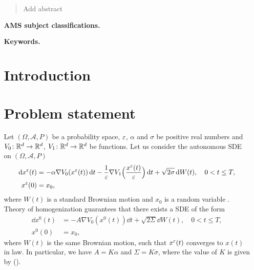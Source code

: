 \documentclass[10pt]{article}
\begin{document}
\maketitle	

\begin{abstract} Add abstract
\end{abstract}

\textbf{AMS subject classifications.} 

\textbf{Keywords.} 

\normalsize
\section{Introduction}

\section{Problem statement}

Let $(\Omega, \mathcal A, P)$ be a probability space, $\varepsilon$, $\alpha$ and $\sigma$ be positive real numbers and $V_0 \colon \mathbb{R}^d \to \mathbb{R}^d$, $V_1 \colon \mathbb{R}^d \to \mathbb{R}^d$ be  functions. Let us consider the autonomous SDE on $(\Omega, \mathcal A, P)$
\begin{equation}\label{eq:SDE_MS}
\begin{aligned}
	\mathrm{d} x^\varepsilon(t) &= -\alpha \nabla V_0(x^\varepsilon(t)) \,\mathrm{d} t - \frac{1}{\varepsilon}\nabla V_1\Big(\frac{x^\varepsilon(t)}{\varepsilon}\Big) \,\mathrm{d} t + \sqrt{2\sigma} \,\mathrm{d} W(t), \quad 0 < t \leq T, \\
	x^\varepsilon(0) &= x_0,
\end{aligned}
\end{equation}
where $W(t)$ is a standard Brownian motion and $x_0$ is a random variable . Theory of homogenization guarantees that there exists a SDE of the form
\begin{equation}\label{eq:SDE_HOM}
\begin{aligned}
	\dd x^0(t) &= -A \nabla V_0(x^0(t)) \dd t + \sqrt{2\Sigma} \dd W(t), \quad 0 < t \leq T, \\
	x^0(0) &= x_0,
\end{aligned}
\end{equation}
where $W(t)$ is the same Brownian motion, such that $x^\varepsilon(t)$ converges to $x(t)$ in law. In particular, we have $A = K\alpha$ and $\Sigma = K\sigma$, where the value of $K$ is given by ().
\end{document}
